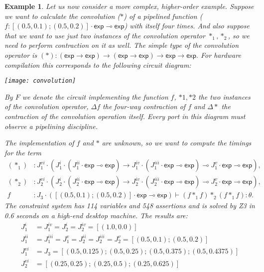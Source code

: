 \documentclass{article}
\newcommand{\lexpt}{\mathsf{exp}}
\newtheorem{example}[theorem]{Example}
\begin{document}
\begin{example}\label{ex:fx4}
Let us now consider a more complex, higher-order example. Suppose we want to calculate the convolution ($*$) of a pipelined function ($f:[(0.5, 0.1);(0.5, 0.2)]\cdot\lexpt\multimap\lexpt$) with itself four times. And also suppose that we want to use just two instances of the convolution operator $*_1, *_2$, so we need to perform contraction on it as well. The simple type of the convolution operator is
$
(*):(\lexpt\rightarrow\lexpt)\rightarrow(\lexpt\rightarrow\lexpt)\rightarrow \lexpt\rightarrow\lexpt.
$ For hardware compilation this corresponds to the following circuit diagram:
\begin{center}
\texttt{[image: convolution]}
\end{center}
By $F$ we denote the circuit implementing the function $f$, $*1, *2$ the two instances of the convolution operator, $\Delta f$ the four-way contraction of $f$ and $\Delta *$ the contraction of the convolution operation itself. Every port in this diagram must observe a pipelining discipline. 

The implementation of $f$ and $*$ are unknown, so we want to compute the timings for the term
\begin{align*}
(*_1)&:J_1^{vi}\cdot(J_1^i\cdot(J_1^{ii}\cdot\lexpt\multimap\lexpt)\rightarrow J_1^{iv}\cdot(J_1^{iii}\cdot\lexpt\multimap\lexpt)\multimap J_1^v\cdot\lexpt\multimap\lexpt),\\
(*_2)&:J_2^{vi}\cdot(J_2^i\cdot(J_2^{ii}\cdot\lexpt\multimap\lexpt)\rightarrow J_2^{iv}\cdot(J_2^{iii}\cdot\lexpt\multimap\lexpt)\multimap J_2^v\cdot\lexpt\multimap\lexpt),\\
f&:J_3\cdot([(0.5, 0.1);(0.5, 0.2)]\cdot\lexpt\multimap\lexpt)\vdash
(f *_1 f) *_2 (f *_1 f): \theta.
\end{align*}
The constraint system has 114 variables and 548 assertions and is solved by Z3 in 0.6 seconds on a high-end desktop machine. The results are:
\begin{align*}
J_1^i &=J_1^{iv}=J_2^i =J_2^{iv}=[(1.0, 0.0)]\\
J_1^{ii} &=J_1^{iii}=J_1^v=J_2^{ii} =J_2^{iii}=J_2^v=[(0.5, 0.1);(0.5, 0.2)]\\
J_1^{vi}&=J_3=[(0.5, 0.125);(0.5, 0.25);(0.5, 0.375);(0.5, 0.4375)]\\
J_2^{vi}&=[(0.25, 0.25);(0.25, 0.5);(0.25, 0.625)]
\end{align*}
\end{example}
\end{document}
